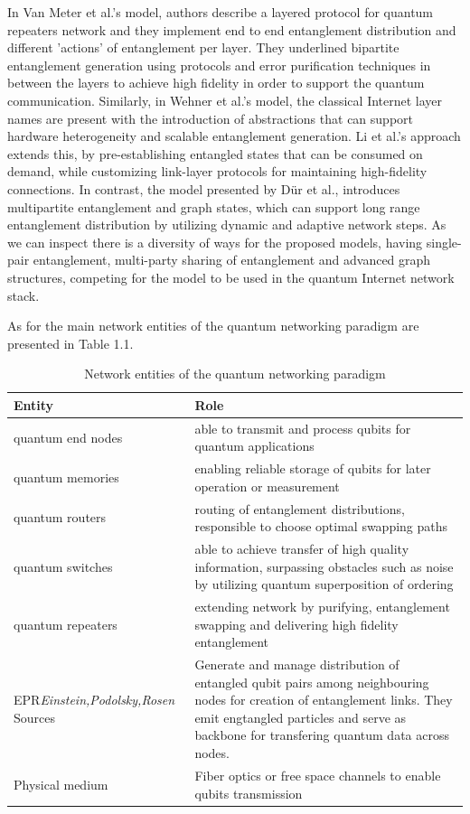 \documentclass[12pt,a4paper] {report}
\begin{document}
		In Van Meter et al.'s model, authors describe a layered protocol for quantum repeaters network and
		they implement end to end entanglement distribution and different 'actions' of entanglement per layer.
		They underlined bipartite entanglement generation using protocols and error purification techniques in between the
		layers to achieve  high fidelity in order to support the quantum communication.
		Similarly, in Wehner et al.'s model, the classical Internet layer names are present with the introduction
		of abstractions that can support hardware heterogeneity and scalable entanglement generation. 
		Li et al.'s approach extends this, by pre-establishing entangled states that can be consumed on demand, 
		while customizing link-layer protocols for maintaining high-fidelity connections. 
		In contrast, the model presented by Dür et al., introduces multipartite entanglement and graph states, 
		which can support long range entanglement distribution by utilizing dynamic and adaptive network steps. 
		As we can inspect there is a diversity of ways for the proposed models, having single-pair entanglement, 
		multi-party sharing of entanglement and advanced graph structures, competing for the model to be used
		in the quantum Internet network stack.

		As for the main network entities of the quantum networking paradigm\cite{e-qnet} are presented in Table 1.1.

		\begin{table}[h!]
		\centering
		\renewcommand{\arraystretch}{1.5}
			\begin{tabular}{|p{5.5cm}|p{10cm}|}
			\hline
			\textbf{Entity} & \textbf{Role} \\ \hline
			quantum end nodes	&  able to transmit and process qubits for quantum applications		\\ \hline
			quantum memories	&  enabling reliable storage of qubits for later operation or measurement 		\\ \hline
			quantum routers		&  routing of entanglement distributions, responsible to choose optimal swapping paths 		\\ \hline
			quantum switches	&  able to achieve transfer of high quality information, surpassing obstacles such as noise by utilizing quantum
				superposition of ordering \\ \hline
			quantum repeaters	& extending network by purifying, entanglement swapping and delivering high fidelity entanglement 		\\ \hline
				EPR\textit{Einstein,Podolsky,Rosen} Sources		&  Generate and manage distribution of entangled qubit pairs among neighbouring nodes for creation of entanglement links. They emit engtangled particles and serve as backbone for transfering quantum data across nodes.		\\ \hline
			Physical medium		&  Fiber optics or free space channels to enable qubits transmission		\\ \hline
		\end{tabular}
		\caption{Network entities of the quantum networking paradigm}
		\label{tab:example}
		\end{table}
\end{document}
